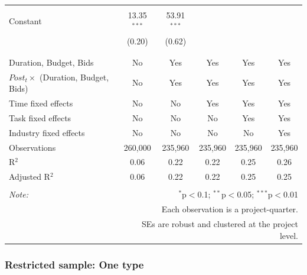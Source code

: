 \documentclass[
]{article}
\begin{document}
\begin{table}[H]
\begin{tabular}{@{\extracolsep{-2pt}}lccccc}
  & & & & & \\ 
 Constant & 13.35$^{***}$ & 53.91$^{***}$ &  &  &  \\ 
  & (0.20) & (0.62) &  &  &  \\ 
  & & & & & \\ 
\hline \\[-1.8ex] 
Duration, Budget, Bids & No & Yes & Yes & Yes & Yes \\ 
$Post_t \times $  (Duration, Budget, Bids) & No & Yes & Yes & Yes & Yes \\ 
Time fixed effects & No & No & Yes & Yes & Yes \\ 
Task fixed effects & No & No & No & Yes & Yes \\ 
Industry fixed effects & No & No & No & No & Yes \\ 
Observations & 260,000 & 235,960 & 235,960 & 235,960 & 235,960 \\ 
R$^{2}$ & 0.06 & 0.22 & 0.22 & 0.25 & 0.26 \\ 
Adjusted R$^{2}$ & 0.06 & 0.22 & 0.22 & 0.25 & 0.25 \\ 
\hline 
\hline \\[-1.8ex] 
\textit{Note:}  & \multicolumn{5}{r}{$^{*}$p$<$0.1; $^{**}$p$<$0.05; $^{***}$p$<$0.01} \\ 
 & \multicolumn{5}{r}{Each observation is a project-quarter.} \\ 
 & \multicolumn{5}{r}{SEs are robust and clustered at the project level.} \\ 
\end{tabular} 
\end{table}

\hypertarget{restricted-sample-one-type}{%
\subsubsection{Restricted sample: One
type}\label{restricted-sample-one-type}}
\end{document}
